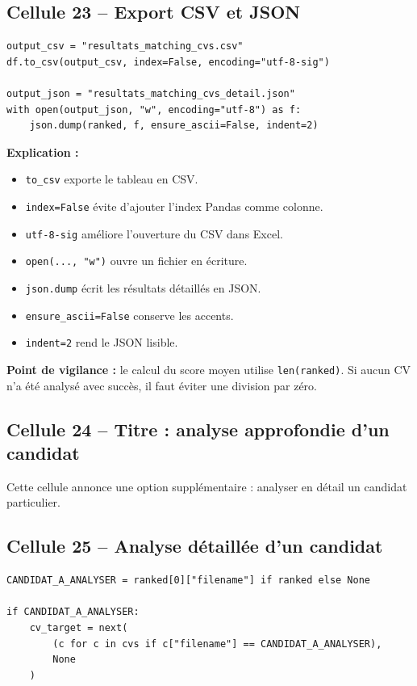 \documentclass[12pt,a4paper]{article}
\begin{document}
\subsection{Cellule 23 -- Export CSV et JSON}

\begin{lstlisting}[style=pythonstyle]
output_csv = "resultats_matching_cvs.csv"
df.to_csv(output_csv, index=False, encoding="utf-8-sig")

output_json = "resultats_matching_cvs_detail.json"
with open(output_json, "w", encoding="utf-8") as f:
    json.dump(ranked, f, ensure_ascii=False, indent=2)
\end{lstlisting}

\textbf{Explication :}
\begin{itemize}
  \item \texttt{to\_csv} exporte le tableau en CSV.
  \item \texttt{index=False} évite d'ajouter l'index Pandas comme colonne.
  \item \texttt{utf-8-sig} améliore l'ouverture du CSV dans Excel.
  \item \texttt{open(..., "w")} ouvre un fichier en écriture.
  \item \texttt{json.dump} écrit les résultats détaillés en JSON.
  \item \texttt{ensure\_ascii=False} conserve les accents.
  \item \texttt{indent=2} rend le JSON lisible.
\end{itemize}

\textbf{Point de vigilance :} le calcul du score moyen utilise \texttt{len(ranked)}. Si aucun CV n'a été analysé avec succès, il faut éviter une division par zéro.

\subsection{Cellule 24 -- Titre : analyse approfondie d'un candidat}

Cette cellule annonce une option supplémentaire : analyser en détail un candidat particulier.

\subsection{Cellule 25 -- Analyse détaillée d'un candidat}

\begin{lstlisting}[style=pythonstyle]
CANDIDAT_A_ANALYSER = ranked[0]["filename"] if ranked else None

if CANDIDAT_A_ANALYSER:
    cv_target = next(
        (c for c in cvs if c["filename"] == CANDIDAT_A_ANALYSER),
        None
    )
\end{lstlisting}
\end{document}
